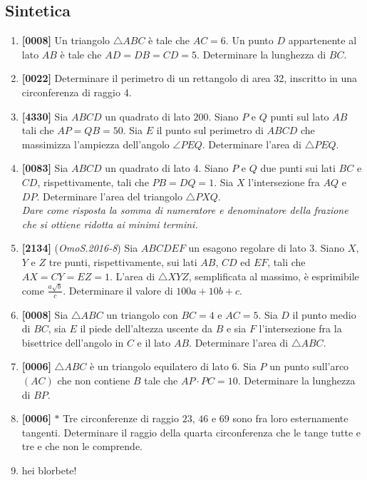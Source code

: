 \documentclass[10pt]{article}
\begin{document}
\subsection{Sintetica}
\begin{enumerate}

\item \textbf{[0008]} Un triangolo $\triangle ABC$ è tale che $AC=6$. Un punto $D$ appartenente al lato $AB$ è tale che $AD=DB=CD=5$. Determinare la lunghezza di $BC$.

\item \textbf{[0022]} Determinare il perimetro di un rettangolo di area 32, inscritto in una circonferenza di raggio 4.

\item \textbf{[4330]} Sia $ABCD$ un quadrato di lato $200$. Siano $P$ e $Q$ punti sul lato $AB$ tali che $AP=QB=50$. Sia $E$ il punto sul perimetro di $ABCD$ che massimizza l'ampiezza dell'angolo $\angle PEQ$. Determinare l'area di $\triangle PEQ$.

\item \textbf{[0083]} Sia $ABCD$ un quadrato di lato 4. Siano $P$ e $Q$ due punti sui lati $BC$ e $CD$, rispettivamente, tali che $PB=DQ=1$. Sia $X$ l'intersezione fra $AQ$ e $DP$. Determinare l'area del triangolo $\triangle PXQ$.\\
\textit{Dare come risposta la somma di numeratore e denominatore della frazione che si ottiene ridotta ai minimi termini.}

\item \textbf{[2134]} (\textit{OmoS.2016-8}) Sia $ABCDEF$ un esagono regolare di lato 3. Siano $X$, $Y$ e $Z$ tre punti, rispettivamente, sui lati $AB$, $CD$ ed $EF$, tali che $AX=CY=EZ=1$. L'area di $\triangle XYZ$, semplificata al massimo, è esprimibile come $\frac{a\sqrt{b}}{c}$. Determinare il valore di $100a+10b+c$.

\item \textbf{[0008]} Sia $\triangle ABC$ un triangolo con $BC=4$ e $AC=5$. Sia $D$ il punto medio di $BC$, sia $E$ il piede dell'altezza uscente da $B$ e sia $F$ l'intersezione fra la bisettrice dell'angolo in $C$ e il lato $AB$. Determinare l'area di $\triangle ABC$.

\item \textbf{[0006]} $\triangle ABC$ è un triangolo equilatero di lato 6. Sia $P$ un punto sull'arco $(AC)$ che non contiene $B$ tale che $AP\cdot PC=10$. Determinare la lunghezza di $BP$.

\item \textbf{[0006]} $\ast$ Tre circonferenze di raggio $23$, $46$ e $69$ sono fra loro esternamente tangenti. Determinare il raggio della quarta circonferenza che le tange tutte e tre e che non le comprende.

\item hei blorbete!

\end{enumerate}
\end{document}
